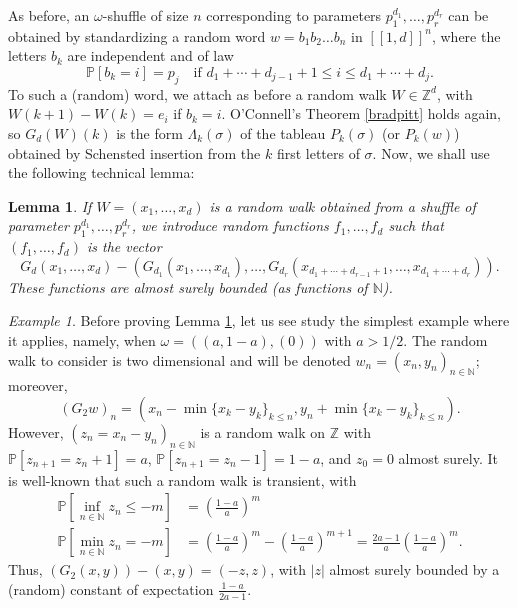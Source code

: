 \documentclass[smallextended,nospthms]{svjour3}
\newtheorem{lemma}[theorem]{Lemma}
\theoremstyle{remark}
\newtheorem*{example}{Example}
\newcommand{\N}{\mathbb{N}}
\newcommand{\Z}{\mathbb{Z}}
\newcommand{\proba}{\mathbb{P}}
\newcommand{\lle}{\left[\!\left[}
\newcommand{\rre}{\right]\!\right]}
\begin{document}
As before, an $\omega$-shuffle of size $n$ corresponding to parameters $p_{1}^{d_{1}},\ldots,p_{r}^{d_{r}}$ can be obtained by standardizing a random word $w=b_{1}b_{2}\ldots b_{n}$ in $\lle 1,d\rre^{n}$, where the letters $b_{k}$ are independent and of law
$$\proba[b_{k}=i]=p_{j}\quad\text{if }d_{1}+\cdots+d_{j-1}+1\leq i \leq d_{1}+\cdots+d_{j}.$$
To such a (random) word, we attach as before a random walk $W\in \Z^{d}$, with $W(k+1)-W(k)=e_{i}$ if $b_{k}=i$. O'Connell's Theorem \ref{bradpitt} holds again, so $G_{d}(W)(k)$ is the form $\Lambda_{k}(\sigma)$ of the tableau $P_{k}(\sigma)$ (or $P_{k}(w)$) obtained by Schensted insertion from the $k$ first letters of $\sigma$. Now, we shall use the following technical lemma:
\begin{lemma}\label{technical}
If $W=(x_{1},\ldots,x_{d})$ is a random walk obtained from a shuffle of parameter $p_{1}^{d_{1}},\ldots,p_{r}^{d_{r}}$, we introduce random functions $f_{1},\ldots,f_{d}$ such that $(f_{1},\ldots,f_{d})$ is the vector
$$
G_{d}(x_{1},\ldots,x_{d})-(G_{d_{1}}(x_{1},\ldots,x_{d_{1}}),\ldots,G_{d_{r}}(x_{d_{1}+\cdots+d_{r-1}+1},\ldots,x_{d_{1}+\cdots+d_{r}})).
$$
These functions are almost surely bounded (as functions of $\N$).
\end{lemma}
\begin{example}
Before proving Lemma \ref{technical}, let us see study the simplest example where it applies, namely, when $\omega=((a,1-a),(0))$ with $a>1/2$. The random walk to consider is two dimensional and will be denoted $w_{n}=(x_{n},y_{n})_{n \in \N}$; moreover,
$$(G_{2}w)_{n}= (x_{n}-\min\{x_{k}-y_{k}\}_{k \leq n},y_{n}+\min\{x_{k}-y_{k}\}_{k \leq n}).$$ However, $(z_{n}=x_{n}-y_{n})_{n \in \N}$ is a random walk on $\Z$ with $\proba[z_{n+1}=z_{n}+1]=a$, $\proba[z_{n+1}=z_{n}-1]=1-a$, and $z_{0}=0$ almost surely. It is well-known that such a random walk is transient, with
\begin{align*}\proba\left[\inf_{n \in \N}z_{n}\leq -m\right]&=\left(\frac{1-a}{a}\right)^{m}\\
\proba\left[\min_{n \in \N}z_{n}=-m\right]&=\left(\frac{1-a}{a}\right)^{m}-\left(\frac{1-a}{a}\right)^{m+1}=\frac{2a-1}{a}\left(\frac{1-a}{a}\right)^{m}.
\end{align*}
Thus, $(G_{2}(x,y))-(x,y)=(-z,z)$, with $|z|$ almost surely bounded by a (random) constant of expectation $\frac{1-a}{2a-1}$.
\end{example}
\end{document}
